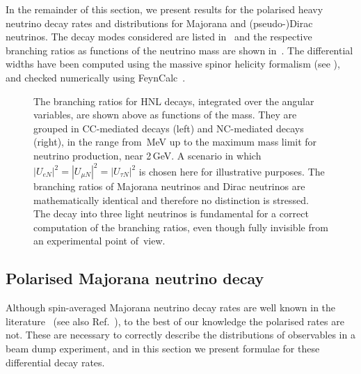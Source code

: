 In the remainder of this section, we present results for the polarised heavy neutrino decay rates %
and distributions for Majorana and (pseudo-)Dirac neutrinos.
The decay modes considered are listed in~ and the respective branching ratios as functions of %
the neutrino mass are shown in~.
%
The differential widths have been computed using the massive spinor helicity formalism %
(see \eg {}), and checked numerically using %
FeynCalc~\cite{Shtabovenko:2016sxi,Mertig:1990an}.

\begin{figure}
	\centering
	\resizebox{\textwidth}{!}{}
	\footnotesize
	\caption{The branching ratios for HNL decays, integrated over the angular variables, are shown above %
		as functions of the mass.
		They are grouped in CC-mediated decays (left) and NC-mediated decays (right), in the range from \,MeV up to %
		the maximum mass limit for neutrino production, near 2\,GeV. 
		A scenario in which $|U_{e N}|^2=|U_{\mu N}|^2=|U_{\tau N}|^2$ is chosen here %
		for illustrative purposes.
		The branching ratios of Majorana neutrinos and Dirac neutrinos are mathematically identical and %
		therefore no distinction is stressed.
		The decay into three light neutrinos is fundamental for a correct computation %
		of the branching ratios, even though fully invisible from an experimental point of~view.}
	\label{fig:branch}
\end{figure}

\subsection{Polarised Majorana neutrino decay}

Although spin-averaged Majorana neutrino decay rates are well known in the literature~\cite{Atre:2009rg,Gorbunov:2007ak,Helo:2010cw} %
(see also Ref.~\cite{Bondarenko:2018ptm}), to the best of our knowledge the polarised rates are not.
These are necessary to correctly describe the distributions of observables in a beam dump experiment, %
and in this section we present formulae for these differential decay rates. 


